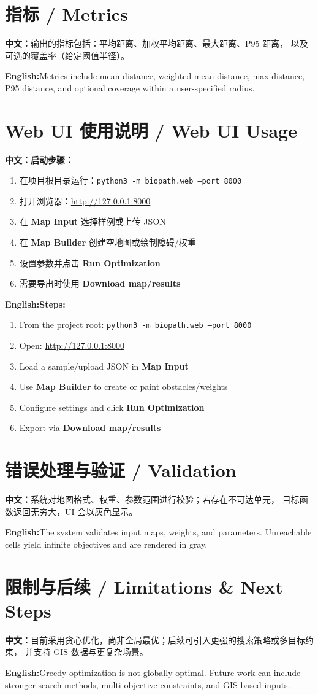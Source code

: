 \documentclass[11pt,a4paper]{article}
\newcommand{\CN}{\textbf{中文：}}
\newcommand{\EN}{\textbf{English:}}
\begin{document}
\section{指标 / Metrics}
\CN 输出的指标包括：平均距离、加权平均距离、最大距离、P95 距离，
以及可选的覆盖率（给定阈值半径）。\par
\EN Metrics include mean distance, weighted mean distance, max distance, P95 distance,
and optional coverage within a user-specified radius.

\section{Web UI 使用说明 / Web UI Usage}
\CN \textbf{启动步骤：}\par
\begin{enumerate}
  \item 在项目根目录运行：\texttt{python3 -m biopath.web --port 8000}
  \item 打开浏览器：\url{http://127.0.0.1:8000}
  \item 在 \textbf{Map Input} 选择样例或上传 JSON
  \item 在 \textbf{Map Builder} 创建空地图或绘制障碍/权重
  \item 设置参数并点击 \textbf{Run Optimization}
  \item 需要导出时使用 \textbf{Download map/results}
\end{enumerate}
\EN \textbf{Steps:}\par
\begin{enumerate}
  \item From the project root: \texttt{python3 -m biopath.web --port 8000}
  \item Open: \url{http://127.0.0.1:8000}
  \item Load a sample/upload JSON in \textbf{Map Input}
  \item Use \textbf{Map Builder} to create or paint obstacles/weights
  \item Configure settings and click \textbf{Run Optimization}
  \item Export via \textbf{Download map/results}
\end{enumerate}

\section{错误处理与验证 / Validation}
\CN 系统对地图格式、权重、参数范围进行校验；若存在不可达单元，
目标函数返回无穷大，UI 会以灰色显示。\par
\EN The system validates input maps, weights, and parameters. Unreachable cells yield
infinite objectives and are rendered in gray.

\section{限制与后续 / Limitations \& Next Steps}
\CN 目前采用贪心优化，尚非全局最优；后续可引入更强的搜索策略或多目标约束，
并支持 GIS 数据与更复杂场景。\par
\EN Greedy optimization is not globally optimal. Future work can include stronger search
methods, multi-objective constraints, and GIS-based inputs.
\end{document}
